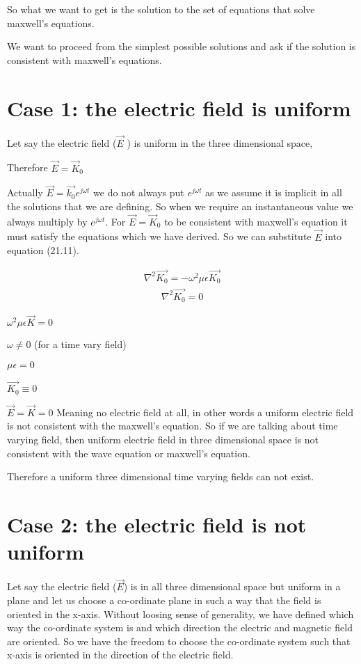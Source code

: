 So what we want to get is the solution to the set of equations that solve maxwell's equations.

We want to proceed from the simplest possible solutions and ask if the solution is consistent with maxwell's equations.

\section{Case 1: the electric field is uniform}

Let say the electric field ($\vec{E}$ ) is uniform in the three dimensional space,

Therefore $\vec{E}=\vec{K}_{0}$

Actually $\vec{E}=\vec{k_{0}}e^{j\omega t}$ we do not always put  $e^{j\omega t}$ as we assume it is implicit in all the solutions that we are defining. So when we require an instantaneous value we always multiply by $e^{j\omega t}$. For $\vec{E}=\vec{K}_{0}$ to be consistent with maxwell's equation it must satisfy the equations which we have derived. So we can substitute $\vec{E}$ into equation (21.11).

\begin{align}
\nabla^2\vec{K_{0}}=-\omega^2\mu\epsilon\vec{K_{0}}
\end{align}
\begin{align}
\nabla^2\vec{K_{0}}=0
\end{align}

$\omega^2\mu\epsilon\vec{K}=0$

$\omega\neq0$ (for a time vary field)

$\mu\epsilon=0$

$\vec{K_{0}}\equiv0$

$\vec{E}=\vec{K}=0$ Meaning no electric field at all, in other words a uniform electric field is not consistent with the maxwell's equation. So if we are talking about time varying field, then uniform electric field in three dimensional space is not consistent with the wave equation or maxwell's equation.

Therefore a uniform three dimensional time varying fields can not exist.

\section{Case 2: the electric field is not uniform}
Let say the electric field ($\vec{E}$) is in all three dimensional space but uniform in a plane and let us choose a co-ordinate plane in such a way that the field is oriented in the x-axis. Without loosing sense of generality, we have defined which way the co-ordinate system is and which direction the electric and magnetic field are oriented. So we have the freedom to choose the co-ordinate system such that x-axis is oriented in the direction of the electric field.

